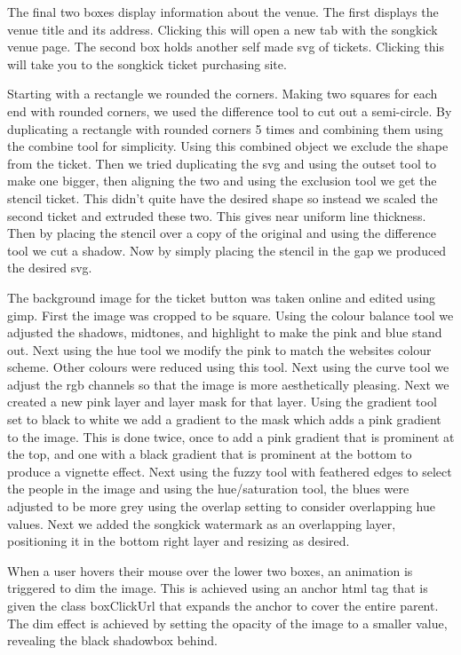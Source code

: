 \documentclass[10pt]{article}
\begin{document}
                The final two boxes display information about the venue. The first displays the venue title and its address. Clicking this will open a new tab with the songkick venue page. The second box holds another self made svg of tickets. Clicking this will take you to the songkick ticket purchasing site.

                Starting with a rectangle we rounded the corners. Making two squares for each end with rounded corners, we used the difference tool to cut out a semi-circle. By duplicating a rectangle with rounded corners 5 times and combining them using the combine tool for simplicity. Using this combined object we exclude the shape from the ticket. Then we tried duplicating the svg and using the outset tool to make one bigger, then aligning the two and using the exclusion tool we get the stencil ticket. This didn't quite have the desired shape so instead we scaled the second ticket and extruded these two. This gives near uniform line thickness. Then by placing the stencil over a copy of the original and using the difference tool we cut a shadow. Now by simply placing the stencil in the gap we produced the desired svg. 

                The background image for the ticket button was taken online and edited using gimp. First the image was cropped to be square. Using the colour balance tool we adjusted the shadows, midtones, and highlight to make the pink and blue stand out. Next using the hue tool we modify the pink to match the websites colour scheme. Other colours were reduced using this tool. Next using the curve tool we adjust the rgb channels so that the image is more aesthetically pleasing. Next we created a new pink layer and layer mask for that layer. Using the gradient tool set to black to white we add a gradient to the mask which adds a pink gradient to the image. This is done twice, once to add a pink gradient that is prominent at the top, and one with a black gradient that is prominent at the bottom to produce a vignette effect. Next using the fuzzy tool with feathered edges to select the people in the image and using the hue/saturation tool, the blues were adjusted to be more grey using the overlap setting to consider overlapping hue values. Next we added the songkick watermark as an overlapping layer, positioning it in the bottom right layer and resizing as desired.

                When a user hovers their mouse over the lower two boxes, an animation is triggered to dim the image. This is achieved using an anchor html tag that is given the class boxClickUrl that expands the anchor to cover the entire parent. The dim effect is achieved by setting the opacity of the image to a smaller value, revealing the black shadowbox behind.
\end{document}
